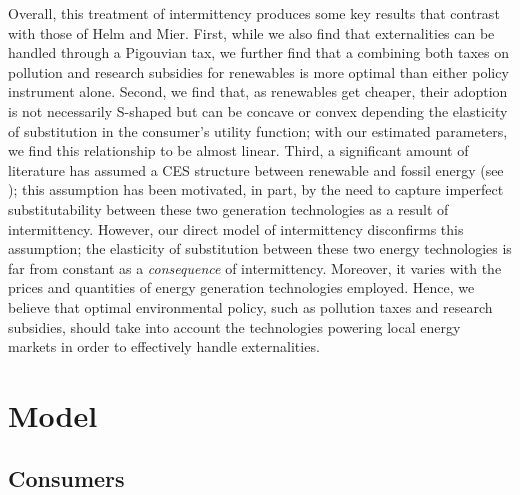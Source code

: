 \documentclass[11pt,a4paper]{extarticle}
\begin{document}
Overall, this treatment of intermittency produces some key results that contrast with those of Helm and Mier. First, while we also find that externalities can be handled through a Pigouvian tax, we further find that a combining both taxes on pollution and research subsidies for renewables is more optimal than either policy instrument alone. Second, we find that, as renewables get cheaper, their adoption is not necessarily S-shaped but can be concave or convex depending the elasticity of substitution in the consumer's utility function; with our estimated parameters, we find this relationship to be almost linear. Third, a significant amount of literature has assumed a CES structure between renewable and fossil energy (see \citet{Pap}); this assumption has been motivated, in part, by the need to capture imperfect substitutability between these two generation technologies as a result of intermittency. However, our direct model of intermittency disconfirms this assumption; the elasticity of substitution between these two energy technologies is far from constant as a \textit{consequence} of intermittency. Moreover, it varies with the prices and quantities of energy generation technologies employed. Hence, we believe that optimal environmental policy, such as pollution taxes and research subsidies, should take into account the technologies powering local energy markets in order to effectively handle externalities. 


\section{Model}


\subsection{Consumers}
\label{sec:consumers}
\end{document}
